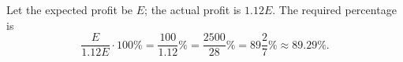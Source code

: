 Let the expected profit be $E$; the actual profit is $1.12E$. The required percentage is
\[
\dfrac{E}{1.12E}\cdot100\%=\dfrac{100}{1.12}\%=\dfrac{2500}{28}\%=\boxed{89\dfrac{2}{7}\%}\approx89.29\% .
\]
